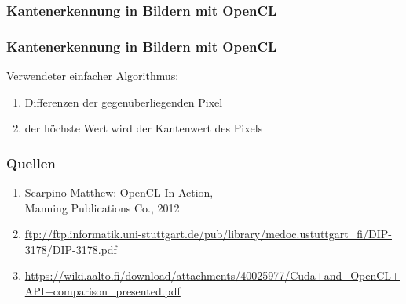 \documentclass{beamer}
\begin{document}
\subsubsection*{Kantenerkennung in Bildern mit OpenCL}
\begin{frame}
\frametitle{Kantenerkennung in Bildern mit OpenCL}
Verwendeter einfacher Algorithmus:
\begin{enumerate}
\item Differenzen der gegenüberliegenden Pixel
\item der höchste Wert wird der Kantenwert des Pixels
\end{enumerate}
\end{frame}

\begin{appendix}
\begin{frame}
\frametitle{Quellen}
\begin{enumerate}
\item Scarpino Matthew: OpenCL In Action, \\Manning Publications Co., 2012
\item \url{ftp://ftp.informatik.uni-stuttgart.de/pub/library/medoc.ustuttgart_fi/DIP-3178/DIP-3178.pdf}
\item \url{https://wiki.aalto.fi/download/attachments/40025977/Cuda+and+OpenCL+API+comparison_presented.pdf}
\end{enumerate}
\end{frame}
\end{appendix}
\end{document}
